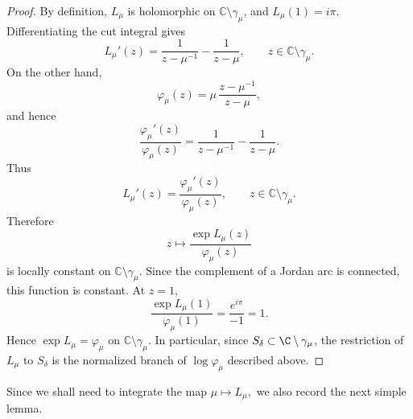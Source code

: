 \documentclass[11pt]{amsart}
\numberwithin{equation}{section}
\newtheorem{lemma}[theorem]{Lemma}
\theoremstyle{definition}
\theoremstyle{plain}
\begin{document}
\begin{proof}
By definition, \(L_\mu\) is holomorphic on
\(\mathbb C\setminus\gamma_\mu\), and \(L_\mu(1)=i\pi\).
Differentiating the cut integral gives
\[
        L_\mu'(z)
        =
        \frac1{z-\mu^{-1}}-\frac1{z-\mu},
        \qquad z\in\mathbb C\setminus\gamma_\mu .
\]
On the other hand,
\[
        \varphi_\mu(z)
        =
        \mu\,\frac{z-\mu^{-1}}{z-\mu},
\]
and hence
\[
        \frac{\varphi_\mu'(z)}{\varphi_\mu(z)}
        =
        \frac1{z-\mu^{-1}}-\frac1{z-\mu}.
\]
Thus
\[
        L_\mu'(z)=\frac{\varphi_\mu'(z)}{\varphi_\mu(z)},
        \qquad z\in\mathbb C\setminus\gamma_\mu .
\]
Therefore
\[
        z\mapsto \frac{\exp L_\mu(z)}{\varphi_\mu(z)}
\]
is locally constant on \(\mathbb C\setminus\gamma_\mu\).  Since the
complement of a Jordan arc is connected, this function is constant.  At
\(z=1\),
\[
        \frac{\exp L_\mu(1)}{\varphi_\mu(1)}
        =
        \frac{e^{i\pi}}{-1}
        =
        1.
\]
Hence \(\exp L_\mu=\varphi_\mu\) on
\(\mathbb C\setminus\gamma_\mu\).  %
In particular, since
$S_\delta\subset\C\setminus\gamma_\mu$, the restriction of
$L_\mu$ to $S_\delta$ is the normalized branch of
$\log\varphi_\mu$ described above.
\end{proof}





Since we shall need to integrate the map $\mu\mapsto L_\mu,$ we also record the next simple lemma.
\end{document}

